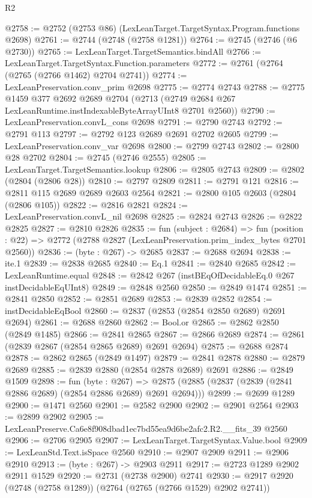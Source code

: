 \begin{lexlean}{R2}
\begin{coremodule}
@2758 := @2752 (@2753 @86) (LexLeanTarget.TargetSyntax.Program.functions @2698)
@2761 := @2744 (@2748 (@2758 @1281))
@2764 := @2745 (@2746 (@6 @2730))
@2765 := LexLeanTarget.TargetSemantics.bindAll
@2766 := LexLeanTarget.TargetSyntax.Function.parameters
@2772 := @2761 (@2764 (@2765 (@2766 @1462) @2704 @2741))
@2774 := LexLeanPreservation.conv_prim @2698
@2775 := @2774 @2743
@2788 := @2775
    @1459
    @377
    @2692
    @2689
    @2704
    (@2713 (@2749 @2684 @267 LexLeanRuntime.instIndexableByteArrayUInt8 @2701 @2560))
@2790 := LexLeanPreservation.convL_cons @2698
@2791 := @2790 @2743
@2792 := @2791 @113
@2797 := @2792 @123 @2689 @2691 @2702 @2605
@2799 := LexLeanPreservation.conv_var @2698
@2800 := @2799 @2743
@2802 := @2800 @28 @2702
@2804 := @2745 (@2746 @2555)
@2805 := LexLeanTarget.TargetSemantics.lookup
@2806 := @2805 @2743
@2809 := @2802 (@2804 (@2806 @28))
@2810 := @2797 @2809
@2811 := @2791 @121
@2816 := @2811 @115 @2689 @2689 @2603 @2564
@2821 := @2800 @105 @2603 (@2804 (@2806 @105))
@2822 := @2816 @2821
@2824 := LexLeanPreservation.convL_nil @2698
@2825 := @2824 @2743
@2826 := @2822 @2825
@2827 := @2810 @2826
@2835 := fun (subject : @2684) =>
  fun (position : @22) => @2772 (@2788 @2827 (LexLeanPreservation.prim_index_bytes @2701 @2560))
@2836 := (byte : @267) -> @2685
@2837 := @2688 @2694
@2838 := ite.{1}
@2839 := @2838 @2685
@2840 := Eq.{1}
@2841 := @2840 @2685
@2842 := LexLeanRuntime.equal
@2848 := @2842 @267 (instBEqOfDecidableEq.{0} @267 instDecidableEqUInt8)
@2849 := @2848 @2560
@2850 := @2849 @1474
@2851 := @2841 @2850
@2852 := @2851 @2689
@2853 := @2839 @2852
@2854 := instDecidableEqBool
@2860 := @2837 (@2853 (@2854 @2850 @2689) @2691 @2694)
@2861 := @2688 @2860
@2862 := Bool.or
@2865 := @2862 @2850 (@2849 @1485)
@2866 := @2841 @2865
@2867 := @2866 @2689
@2874 := @2861 (@2839 @2867 (@2854 @2865 @2689) @2691 @2694)
@2875 := @2688 @2874
@2878 := @2862 @2865 (@2849 @1497)
@2879 := @2841 @2878
@2880 := @2879 @2689
@2885 := @2839 @2880 (@2854 @2878 @2689) @2691
@2886 := @2849 @1509
@2898 := fun (byte : @267) =>
  @2875 (@2885 (@2837 (@2839 (@2841 @2886 @2689) (@2854 @2886 @2689) @2691 @2694)))
@2899 := @2699 @1289
@2900 := @1471 @2560
@2901 := @2582 @2900
@2902 := @2901 @2564
@2903 := @2899 @2902
@2905 := LexLeanPreserve.Ca6e8f908dbad1ec7bd55ea9d6be2afc2.R2.__fits_39 @2560
@2906 := @2706 @2905
@2907 := LexLeanTarget.TargetSyntax.Value.bool
@2909 := LexLeanStd.Text.isSpace @2560
@2910 := @2907 @2909
@2911 := @2906 @2910
@2913 := (byte : @267) -> @2903 @2911
@2917 := @2723 @1289 @2902 @2911 @1529
@2920 := @2731 (@2738 @2900) @2741
@2930 := @2917 @2920 (@2748 (@2758 @1289)) (@2764 (@2765 (@2766 @1529) @2902 @2741))

\end{coremodule}
\end{lexlean}

